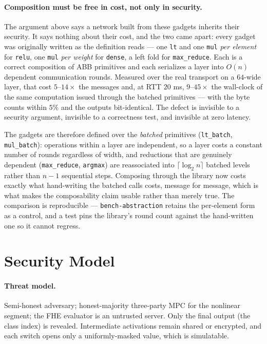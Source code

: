 \documentclass[11pt]{article}
\theoremstyle{plain}
\theoremstyle{definition}
\theoremstyle{remark}
\newcommand{\bt}[1]{\texttt{#1}}
\begin{document}
\paragraph{Composition must be free in cost, not only in security.} The
argument above says a network built from these gadgets inherits their
security. It says nothing about their cost, and the two came apart: every
gadget was originally written as the definition reads --- one \bt{lt} and one
\bt{mul} \emph{per element} for \bt{relu}, one \bt{mul} \emph{per weight}
for \bt{dense}, a left fold for \bt{max\_reduce}. Each is a correct
composition of ABB primitives and each serializes a layer into $O(n)$
dependent communication rounds. Measured over the real transport on a
$64$-wide layer, that cost $5$--$14\times$ the messages and, at RTT $20$ ms,
$9$--$45\times$ the wall-clock of the same computation issued through the
batched primitives --- with the byte counts within $5\%$ and the outputs
bit-identical. The defect is invisible to a security argument, invisible to a
correctness test, and invisible at zero latency.

The gadgets are therefore defined over the \emph{batched} primitives
(\bt{lt\_batch}, \bt{mul\_batch}): operations within a layer are independent,
so a layer costs a constant number of rounds regardless of width, and
reductions that are genuinely dependent (\bt{max\_reduce}, \bt{argmax}) are
reassociated into $\lceil\log_2 n\rceil$ batched levels rather than $n-1$
sequential steps. Composing through the library now costs exactly what
hand-writing the batched calls costs, message for message, which is what makes
the composability claim usable rather than merely true.
The comparison is reproducible --- \bt{bench-abstraction} retains the
per-element form as a control, and a test pins the library's round count
against the hand-written one so it cannot regress.

\section{Security Model}\label{sec:security}

\paragraph{Threat model.} Semi-honest adversary; honest-majority
three-party MPC for the nonlinear segment; the FHE evaluator is an untrusted
server. Only the final output (the class index) is revealed. Intermediate
activations remain shared or encrypted, and each switch opens only a
uniformly-masked value, which is simulatable.
\end{document}
